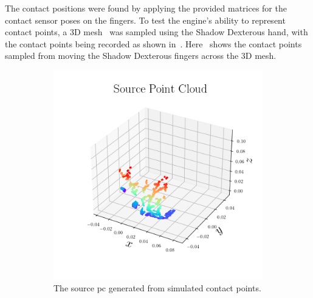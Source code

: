 The contact positions were found by applying the provided matrices for the contact sensor poses on the fingers.
To test the engine's ability to represent contact points, a 3D mesh~\cite{stanford-bunny} was sampled using the Shadow Dexterous hand, with the contact points being recorded as shown in~. Here~ shows the contact points sampled from moving the Shadow Dexterous fingers across the 3D mesh.

\begin{figure}[!h]
	\centering
	\begin{subfigure}[b]{0.3\textwidth}
		\centering
		\includegraphics[width=\textwidth]{chapters/1-tactile-perception/fig/matplotlib/pc_source.png}
		\caption{The source \gls{pc} generated from simulated contact points.}
		\label{fig:pc-source}
	\end{subfigure}
	\begin{subfigure}[b]{0.3\textwidth}
		\centering

\end{subfigure}
\end{figure}
